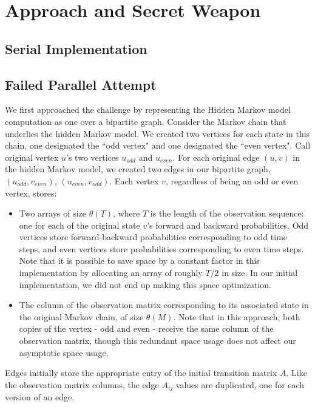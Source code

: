 \section{Approach and Secret Weapon}

\subsection{Serial Implementation}

\subsection{Failed Parallel Attempt}
We first approached the challenge by representing the Hidden Markov model computation as one over a bipartite graph.  Consider the Markov chain that underlies the hidden Markov model.  We created two vertices for each state in this chain, one designated the ``odd vertex" and one designated the ``even vertex".  Call original vertex $u$'s two vertices $u_{odd}$ and $u_{even}$. For each original edge $(u, v)$ in the hidden Markov model, we created two edges in our bipartite graph, $(u_{odd}, v_{even})$, $(u_{even}, v_{odd})$.   Each vertex $v$, regardless of being an odd or even vertex, stores: 

\begin{itemize}
	\item Two arrays of size $\theta(T)$, where $T$ is the length of the observation sequence: one for each of the original state $v$'s forward and backward probabilities.  Odd vertices store forward-backward probabilities corresponding to odd time steps, and even vertices store probabilities corresponding to even time steps.  Note that it is possible to save space by a constant factor in this implementation by allocating an array of roughly $T/2$ in size.  In our initial implementation, we did not end up making this space optimization.  
	
	\item The column of the observation matrix corresponding to its associated state in the original Markov chain, of size $\theta(M)$.  Note that in this approach, both copies of the vertex - odd and even - receive the same column of the observation matrix, though this redundant space usage does not affect our asymptotic space usage.
\end{itemize}

Edges initially store the appropriate entry of the initial transition matrix $A$.  Like the observation matrix columns, the edge $A_{ij}$ values are duplicated, one for each version of an edge.

